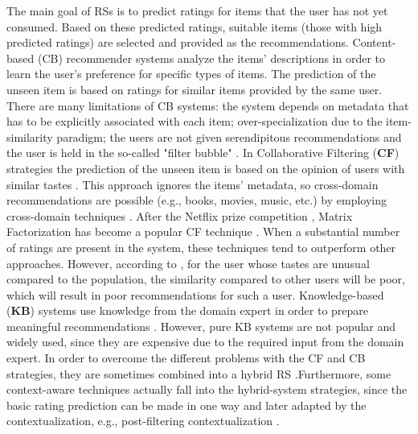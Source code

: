 \documentclass{llncs}
\begin{document}
The main goal of RSs is to predict ratings for items that the user has not yet consumed. Based on these predicted ratings, suitable items (those with high predicted ratings) are selected and provided as the recommendations. Content-based (CB) recommender systems  \cite{pazzani2007content} analyze the items’ descriptions in order to learn the user’s preference for specific types of items. The prediction of the unseen item is based on ratings for similar items provided by the same user. There are many limitations of CB systems: the system depends on metadata that has to be explicitly associated with each item; over-specialization due to the item-similarity paradigm; the users are not given serendipitous recommendations and the user is held in the so-called "filter bubble" \cite{pariser2011filter}. In Collaborative Filtering (\textbf{CF}) strategies the prediction of the unseen item is based on the opinion of users with similar tastes  \cite{resnick1994grouplens}. This approach ignores the items' metadata, so cross-domain recommendations are possible (e.g., books, movies, music, etc.) by employing cross-domain techniques \cite{fernandez2012cross}. After the Netflix prize competition \cite{bennett2007netflix}, Matrix Factorization has become a popular CF technique \cite{Koren2008factorization,koren2009matrix}. When a substantial number of ratings are present in the system, these techniques tend to outperform other approaches. However, according to \cite{balabanovic1997fab}, for the user whose tastes are unusual compared to the population, the similarity compared to other users will be poor, which will result in poor recommendations for such a user. Knowledge-based (\textbf{KB}) systems use knowledge from the domain expert in order to prepare meaningful recommendations  \cite{schafer1999recommender}. However, pure KB systems are not popular and widely used, since they are expensive due to the required input from the domain expert. In order to overcome the different problems with the CF and CB strategies, they are sometimes combined into a hybrid RS \cite{burke2007hybrid}.Furthermore, some context-aware techniques actually fall into the hybrid-system strategies, since the basic rating prediction can be made in one way and later adapted by the contextualization, e.g., post-filtering contextualization  \cite{Adomavicius2011}. 
\end{document}
